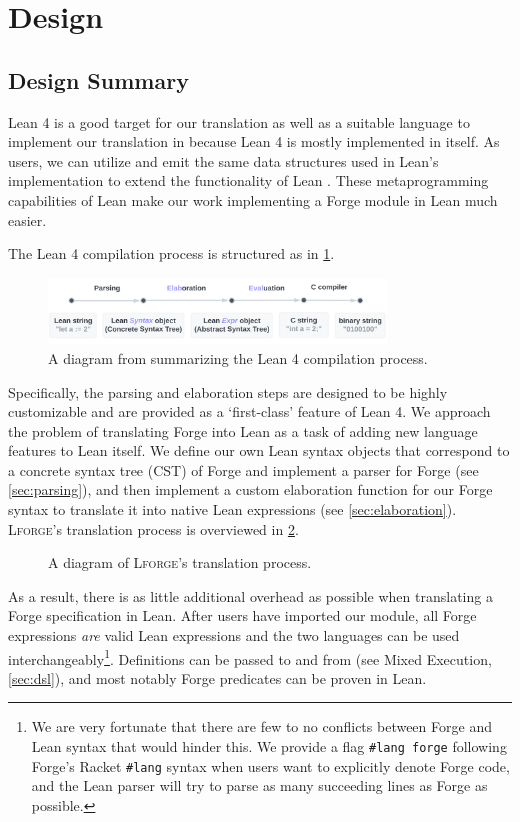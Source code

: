\section{Design}
\subsection{Design Summary}\label{sec:design-summary}
Lean 4 is a good target for our translation as well as a suitable language to implement our translation in because Lean 4 is mostly implemented in itself. As users, we can utilize and emit the same data structures used in Lean's implementation to extend the functionality of Lean \cite{moura2021lean}. These metaprogramming capabilities of Lean make our work implementing a Forge module in Lean much easier. 

The Lean 4 compilation process is structured as in \cref{fig:lean-compilation}. 
\begin{figure}[h!]
\centering
\includegraphics[width=0.8\textwidth]{images/lean-compiler.png}
\caption{A diagram from \cite{metaprogramming} summarizing the Lean 4 compilation process.}
\label{fig:lean-compilation}
\end{figure}

Specifically, the parsing and elaboration steps are designed to be highly customizable and are provided as a `first-class' feature of Lean 4. We approach the problem of translating Forge into Lean as a task of adding new language features to Lean itself. We define our own Lean syntax objects that correspond to a concrete syntax tree (CST) of Forge and implement a parser for Forge (see \cref{sec:parsing}), and then implement a custom elaboration function for our Forge syntax to translate it into native Lean expressions (see \cref{sec:elaboration}). \textsc{Lforge}'s translation process is overviewed in \cref{fig:lforge-process}. 

\begin{figure}[h!]
\centering

\caption{A diagram of \textsc{Lforge}'s translation process.}
\label{fig:lforge-process}
\end{figure}  

As a result, there is as little additional overhead as possible when translating a Forge specification in Lean. After users have imported our module, all Forge expressions \emph{are} valid Lean expressions and the two languages can be used interchangeably\footnote{We are very fortunate that there are few to no conflicts between Forge and Lean syntax that would hinder this. We provide a flag \texttt{\#lang forge} following Forge's Racket \texttt{\#lang} syntax when users want to explicitly denote Forge code, and the Lean parser will try to parse as many succeeding lines as Forge as possible.}. Definitions can be passed to and from (see Mixed Execution, \cref{sec:dsl}), and most notably Forge predicates can be proven in Lean. 

